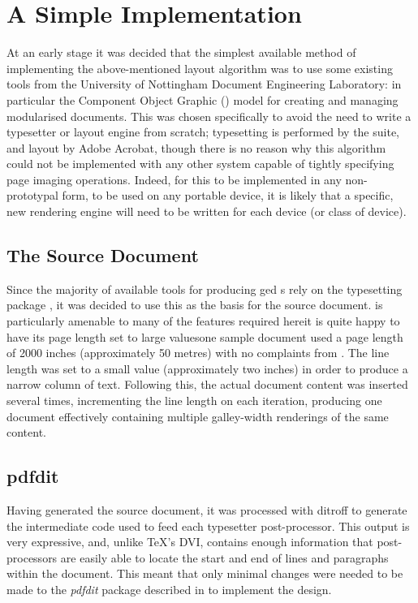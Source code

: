 \section{A Simple Implementation}
At an early stage it was decided that the simplest available method of implementing the above-mentioned layout algorithm was to use some existing tools from the University of Nottingham Document Engineering Laboratory: in particular the Component Object Graphic (\COG{}) model\cite{Bagley2003} for creating and managing modularised \pdf{} documents. This was chosen specifically to avoid the need to write a typesetter or layout engine from scratch; typesetting is performed by the \troff{} suite, and layout by Adobe Acrobat, though there is no reason why this algorithm could not be implemented with any other system capable of tightly specifying page imaging operations. Indeed, for this to be implemented in any non-prototypal form, \ie{} to be used on any portable device, it is likely that a specific, new rendering engine will need to be written for each device (or class of device).

\subsection{The Source Document}\label{sec:srcdoc}
Since the majority of available tools for producing \COG{}ged \pdf{}s rely on the typesetting package \ditroff{}, it was decided to use this as the basis for the source document. \Ditroff{} is particularly amenable to many of the features required here\ed{}it is quite happy to have its page length set to large values\ed{}one sample document used a page length of 2000 inches (approximately 50 metres) with no complaints from \ditroff{}. The line length was set to a small value (approximately two inches) in order to produce a narrow column of text. Following this, the actual document content was inserted several times, incrementing the line length on each iteration, producing one document effectively containing multiple galley-width renderings of the same content.

\subsection{pdfdit}
Having generated the source document, it was processed with ditroff to generate the intermediate code used to feed each typesetter post-pro\-cessor. This output is very expressive, and, unlike \TeX's DVI, contains enough information that post-processors are easily able to locate the start and end of lines and paragraphs within the document. This meant that only minimal changes were needed to be made to the \emph{pdfdit} package described in \cite{Bagley2003} to implement the design.

